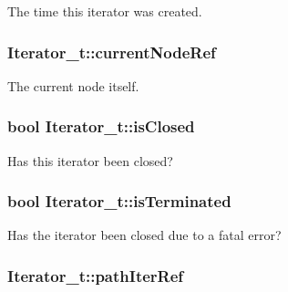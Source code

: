 The time this iterator was created. 

\subsubsection[{\texorpdfstring{current\+Node\+Ref}{currentNodeRef}}]{ Iterator\+\_\+t\+::current\+Node\+Ref}\hypertarget{struct_iterator__t_a831c03cf118d0ac30d67e664ab49f5a5}{}\label{struct_iterator__t_a831c03cf118d0ac30d67e664ab49f5a5}


The current node itself. 

\subsubsection[{\texorpdfstring{is\+Closed}{isClosed}}]{\setlength{\rightskip}{0pt plus 5cm}bool Iterator\+\_\+t\+::is\+Closed}\hypertarget{struct_iterator__t_afb3098af280e2634bdd21cb34fc1d0a9}{}\label{struct_iterator__t_afb3098af280e2634bdd21cb34fc1d0a9}


Has this iterator been closed? 

\subsubsection[{\texorpdfstring{is\+Terminated}{isTerminated}}]{\setlength{\rightskip}{0pt plus 5cm}bool Iterator\+\_\+t\+::is\+Terminated}\hypertarget{struct_iterator__t_a4225f496cbbe8d552aa0af909da10576}{}\label{struct_iterator__t_a4225f496cbbe8d552aa0af909da10576}


Has the iterator been closed due to a fatal error? 

\subsubsection[{\texorpdfstring{path\+Iter\+Ref}{pathIterRef}}]{ Iterator\+\_\+t\+::path\+Iter\+Ref}\hypertarget{struct_iterator__t_a5fefff652d200b321128de47f924cdea}{}\label{struct_iterator__t_a5fefff652d200b321128de47f924cdea}


